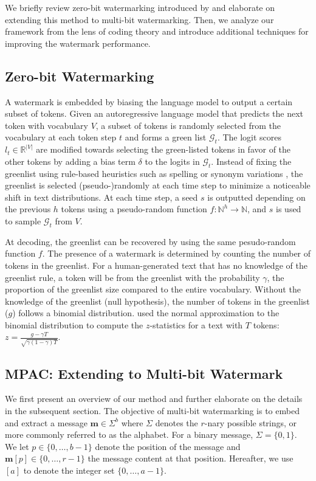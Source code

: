 

We briefly review zero-bit watermarking introduced by \citet{kirchenbauer2023watermark} and elaborate on extending this method to multi-bit watermarking. Then, we analyze our framework from the lens of coding theory and introduce additional techniques for improving the watermark performance. 
\subsection{Zero-bit Watermarking \citep{kirchenbauer2023watermark}}\label{subsec:zwb}
A watermark is embedded by biasing the language model to output a certain subset of tokens. 
Given an autoregressive language model that predicts the next token with vocabulary $V$,
a subset of tokens is randomly selected from the vocabulary at each token step $t$ and forms a green list $\mathcal{G}_t$. The logit scores  $l_t \in \mathbb{R}^{|V|}$ are modified towards selecting the green-listed tokens in favor of the other tokens by adding a bias term $\delta$ to the logits in $\mathcal{G}_t$. Instead of fixing the greenlist using rule-based heuristics such as spelling or synonym variations \citep{he2022protecting}, the greenlist is selected (pseudo-)randomly at each time step to minimize a noticeable shift in text distributions. At each time step, a seed $s$ is outputted depending on the previous $h$ tokens using a pseudo-random function $f: \mathbb{N}^h \rightarrow \mathbb{N}$, and $s$ is used to sample $\mathcal{G}_t$ from $V$. 

At decoding, the greenlist can be recovered by using the same pesudo-random function $f$. The presence of a watermark is determined by counting the number of tokens in the greenlist. For a human-generated text that has no knowledge of the greenlist rule, a token will be from the greenlist with the probability $\gamma$, the proportion of the greenlist size compared to the entire vocabulary. Without the knowledge of the greenlist (null hypothesis), the number of tokens in the greenlist ($g$) follows a binomial distribution. \citep{kirchenbauer2023watermark} used the normal approximation to the binomial distribution to compute the $z$-statistics for a text with $T$ tokens: $z = \frac{g - \gamma T}{\sqrt{\gamma(1-\gamma)T}}$. 


\subsection{MPAC: Extending to Multi-bit Watermark}
\label{subsec:multibit}
We first present an overview of our method and further elaborate on the details in the subsequent section. The objective of multi-bit watermarking is to embed and extract a message $\mathbf{m} \in \Sigma^b$ where $\Sigma$ denotes the $r$-nary possible strings, or more commonly referred to as the alphabet. For a binary message, $\Sigma=\{0,1\}$.  We let $p \in \{0, \dots, b-1\}$ denote the position of the message and $\mathbf{m}[p] \in \{0, \dots, r-1\}$ the message content at that position. Hereafter, we use $[a]$ to denote the integer set $\{0, \dots, a-1\}$. 

